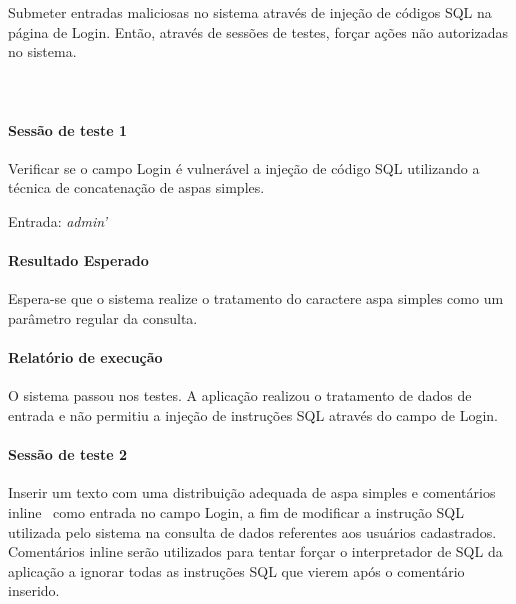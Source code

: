 \documentclass[
    12pt,               %
    openright,          %
    oneside,            %
    a4paper,            %
    section=TITLE,     %
    english,            %
    french,             %
    spanish,            %
    brazil              %
    ]{abntex2}
\newcommand{\citep}{\cite}
\begin{document}
Submeter entradas maliciosas no sistema através de injeção de códigos SQL na página de Login. Então, através de sessões de testes, forçar ações não autorizadas no sistema.



\paragraph*{~}


\paragraph*{Sessão de teste 1}

Verificar se o campo Login é vulnerável a injeção de código SQL utilizando a técnica de concatenação de aspas simples.


Entrada: \emph{admin\rq{}}



\paragraph*{Resultado Esperado}

Espera-se que o sistema realize o tratamento do caractere aspa simples como um parâmetro regular da consulta.



\paragraph*{Relatório de execução}

O sistema passou nos testes. A aplicação realizou o tratamento de dados de entrada e não permitiu a injeção de instruções SQL através do campo de Login.





\paragraph*{Sessão de teste 2}

Inserir um texto com uma distribuição adequada de aspa simples e comentários inline \citep{62214,62213,62212}~como entrada no campo Login, a fim de modificar a instrução SQL utilizada pelo sistema na consulta de dados referentes aos usuários cadastrados. Comentários inline serão utilizados para tentar forçar o interpretador de SQL da aplicação a ignorar todas as instruções SQL que vierem após o comentário inserido.
\end{document}
